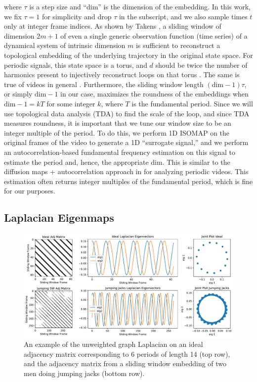\documentclass{article}
\begin{document}
where $\tau$ is a step size and ``dim'' is the dimension of the embedding.  In this work, we fix $\tau = 1$ for simplicity and drop $\tau$ in the subscript, and we also sample times $t$ only at integer frame indices.  As shown by Takens \cite{takens1981detecting}, a sliding window of dimension $2m+1$ of even a single generic observation function (time series) of a dynamical system of intrinsic dimension $m$ is sufficient to reconstruct a topological embedding of the underlying trajectory in the original state space.  For periodic signals, this state space is a torus, and $d$ should be twice the number of harmonics present to injectively reconstruct loops on that torus \cite{perea2015sliding}.  The same is true of videos in general \cite{tralie2017quasi}.  Furthermore, the sliding window length $(\text{dim}-1) \tau$, or simply $\text{dim}-1$ in our case, maximizes the roundness of the embeddings when $\text{dim}-1 = k T$ for some integer $k$, where $T$ is the fundamental period.  Since we will use topological data analysis (TDA) to find the scale of the loop, and since TDA measures roundness, it is important that we tune our window size to be an integer multiple of the period.  To do this, we perform 1D ISOMAP \cite{tenenbaum2000global} on the original frames of the video to generate a 1D ``surrogate signal,'' and we perform an autocorrelation-based fundamental frequency estimation \cite{Mcleod05asmarter} on this signal to estimate the period and, hence, the appropriate dim.  This is similar to the diffusion maps + autocorrelation approach in \cite{tralie2017quasi} for analyzing periodic videos.  This estimation often returns integer multiples of the fundamental period, which is fine for our purposes.

\subsection{Laplacian Eigenmaps}
\label{sec:laplacian}

\begin{figure}[h!]
\centering
\includegraphics[width=\columnwidth]{CirculantExample.pdf}
\caption{An example of the unweighted graph Laplacian on an ideal adjacency matrix corresponding to 6 periods of length 14 (top row), and the adjacency matrix from a sliding window embedding of two men doing jumping jacks (bottom row).  }
\label{fig:CirculantExample}
\end{figure}
\end{document}
